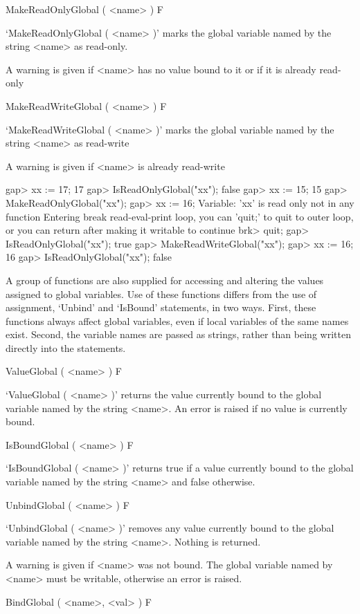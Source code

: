 {\>MakeReadOnlyGlobal ( <name> ) F

`MakeReadOnlyGlobal ( <name> )' marks the global variable named
by the string <name> as read-only. 

A warning is given if <name> has no value bound to it or if it is
already read-only

\>MakeReadWriteGlobal ( <name> )  F

`MakeReadWriteGlobal ( <name> )' marks the global variable named
by the string <name> as read-write

A warning is given if <name> is already read-write

\begintt
gap> xx := 17;
17
gap> IsReadOnlyGlobal("xx");
false
gap> xx := 15;
15
gap> MakeReadOnlyGlobal("xx");
gap> xx := 16;
Variable: 'xx' is read only
not in any function
Entering break read-eval-print loop, you can 'quit;' to quit to outer loop,
or you can return after making it writable to continue
brk> quit;
gap> IsReadOnlyGlobal("xx");
true
gap> MakeReadWriteGlobal("xx");
gap> xx := 16;
16
gap> IsReadOnlyGlobal("xx");   
false
\endtt

A group of functions are also supplied for accessing and altering the
values assigned to global variables. Use of these functions differs
from the use of assignment, `Unbind' and `IsBound' statements, in two
ways.
First, these functions always affect global variables, even if 
local variables of the same names exist.
Second, the variable names are passed as strings,
rather than being written directly into the statements. 

\>ValueGlobal ( <name> ) F
 
`ValueGlobal ( <name> )' returns the value currently bound to the global
variable named by the string <name>. An error is raised if no value
is currently bound.

\>IsBoundGlobal ( <name> ) F

`IsBoundGlobal ( <name> )' returns true if a value currently bound
to the global variable named by the string <name> and false otherwise.

\>UnbindGlobal ( <name> ) F

`UnbindGlobal ( <name> )' removes any value currently bound
to the global variable named by the string <name>. Nothing is returned.

A warning is given if <name> was not bound. The global variable named
by <name> must be writable, otherwise an error is raised.

\>BindGlobal ( <name>, <val> )  F

}
